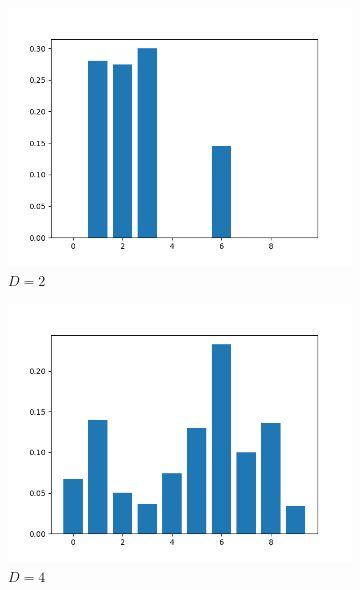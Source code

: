 \documentclass[conference]{IEEEtran}
\begin{document}
\begin{figure}[htbp]
    \centering
    \begin{subfigure}{.33\textwidth}
        \centering
        \includegraphics[width=1\linewidth]{images/fb/weights_d2.png}
        \caption{$D=2$}
        \label{fig:fb_emb_weights_d2}
    \end{subfigure}%
    \begin{subfigure}{.33\textwidth}
        \centering
        \includegraphics[width=1\linewidth]{images/fb/weights_d4.png}
        \caption{$D=4$}
        \label{fig:fb_emb_weights_d4}
    \end{subfigure}%
    \begin{subfigure}{.33\textwidth}

\end{subfigure}
\end{figure}
\end{document}
